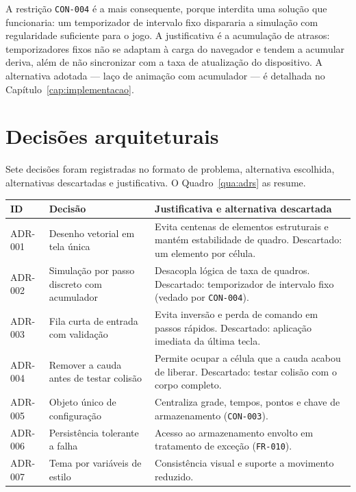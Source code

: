 A restrição \texttt{CON-004} é a mais consequente, porque interdita uma solução
que funcionaria: um temporizador de intervalo fixo dispararia a simulação com
regularidade suficiente para o jogo. A justificativa é a acumulação de atrasos:
temporizadores fixos não se adaptam à carga do navegador e tendem a acumular
deriva, além de não sincronizar com a taxa de atualização do dispositivo. A
alternativa adotada --- laço de animação com acumulador --- é detalhada no
Capítulo~\ref{cap:implementacao}.

\section{Decisões arquiteturais}
\label{sec:esp-adr}

Sete decisões foram registradas no formato de problema, alternativa escolhida,
alternativas descartadas e justificativa. O Quadro~\ref{qua:adrs} as resume.

\begin{quadro}[htb]
	\caption{Decisões arquiteturais do sistema-alvo}
	\label{qua:adrs}
	\centering
	\footnotesize
	\begin{tabularx}{\textwidth}{@{}p{1.7cm} p{3.1cm} X@{}}
		\toprule
		\textbf{ID} & \textbf{Decisão} & \textbf{Justificativa e alternativa descartada} \\
		\midrule
		ADR-001 & Desenho vetorial em tela única & Evita centenas de elementos estruturais e mantém estabilidade de quadro. Descartado: um elemento por célula. \\
		\addlinespace
		ADR-002 & Simulação por passo discreto com acumulador & Desacopla lógica de taxa de quadros. Descartado: temporizador de intervalo fixo (vedado por \texttt{CON-004}). \\
		\addlinespace
		ADR-003 & Fila curta de entrada com validação & Evita inversão e perda de comando em passos rápidos. Descartado: aplicação imediata da última tecla. \\
		\addlinespace
		ADR-004 & Remover a cauda antes de testar colisão & Permite ocupar a célula que a cauda acabou de liberar. Descartado: testar colisão com o corpo completo. \\
		\addlinespace
		ADR-005 & Objeto único de configuração & Centraliza grade, tempos, pontos e chave de armazenamento (\texttt{CON-003}). \\
		\addlinespace
		ADR-006 & Persistência tolerante a falha & Acesso ao armazenamento envolto em tratamento de exceção (\texttt{FR-010}). \\
		\addlinespace
		ADR-007 & Tema por variáveis de estilo & Consistência visual e suporte a movimento reduzido. \\
		\bottomrule
	\end{tabularx}
\end{quadro}


